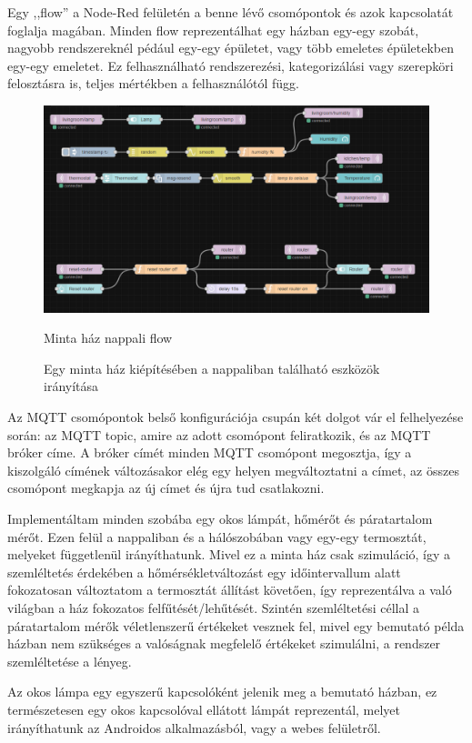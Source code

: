 \documentclass[
]{thesis-ekf}
\theoremstyle{definition}
\theoremstyle{remark}
\begin{document}
Egy ,,flow'' a Node-Red felületén a benne lévő csomópontok és azok kapcsolatát foglalja magában. 
Minden flow reprezentálhat egy házban egy-egy szobát, nagyobb rendszereknél pédául egy-egy épületet, vagy több emeletes épületekben egy-egy emeletet.
Ez felhasználható rendszerezési, kategorizálási vagy szerepköri felosztásra is, teljes mértékben a felhasználótól függ.

\begin{figure}[h]
	\includegraphics[width=1\textwidth]{images/flow.png}
	\caption{Minta ház nappali flow}
	\caption{Egy minta ház kiépítésében a nappaliban található eszközök irányítása}
\end{figure}

Az MQTT csomópontok belső konfigurációja csupán két dolgot vár el felhelyezése során: az MQTT topic, amire az adott csomópont feliratkozik, és az MQTT bróker címe. A bróker címét minden MQTT csomópont megosztja, így a kiszolgáló címének változásakor
elég egy helyen megváltoztatni a címet, az összes csomópont megkapja az új címet és újra tud csatlakozni.

Implementáltam minden szobába egy okos lámpát, hőmérőt és páratartalom mérőt. Ezen felül a nappaliban és a hálószobában vagy egy-egy termosztát, melyeket függetlenül irányíthatunk. Mivel ez a minta ház csak szimuláció, így a szemléltetés érdekében
a hőmérsékletváltozást egy időintervallum alatt fokozatosan változtatom a termosztát állítást követően, így reprezentálva a való világban a ház fokozatos felfűtését/lehűtését. Szintén szemléltetési céllal a páratartalom mérők
véletlenszerű értékeket vesznek fel, mivel egy bemutató példa házban nem szükséges a valóságnak megfelelő értékeket szimulálni, a rendszer szemléltetése a lényeg.

Az okos lámpa egy egyszerű kapcsolóként jelenik meg a bemutató házban, ez természetesen egy okos kapcsolóval ellátott lámpát reprezentál, melyet irányíthatunk az Androidos alkalmazásból, vagy a webes felületről.
\end{document}
